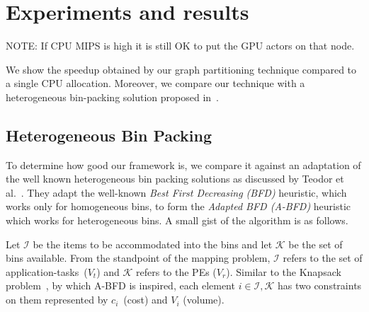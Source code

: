 \documentclass[10pt, conference, compsocconf]{IEEEtran}
\begin{document}




\section{Experiments and results}
\label{sec:experiments-results}
NOTE: If CPU MIPS is high it is still OK to put the GPU actors on that
node.

We show the speedup obtained by our graph partitioning technique
compared to a single CPU allocation. Moreover, we compare our technique
with a heterogeneous bin-packing solution proposed in~\cite{mmar11}.


\subsection{Heterogeneous Bin Packing}

To determine how good our framework is, we compare it against an
adaptation of the well known heterogeneous bin packing solutions as
discussed by Teodor et al.~\cite{tcra11}. They adapt the well-known
\textit{Best First Decreasing (BFD)} heuristic, which works only for
homogeneous bins, to form the \textit{Adapted BFD (A-BFD)} heuristic
which works for heterogeneous bins. A small gist of the algorithm is as
follows.

Let $\mathcal{I}$ be the items to be accommodated into the bins and let
$\mathcal{K}$ be the set of bins available.  From the standpoint of the
mapping problem, $\mathcal{I}$ refers to the set of
\mbox{application-tasks ($V_t$)} and $\mathcal{K}$ refers to the PEs
($V_r$). Similar to the Knapsack problem~\cite{sski08}, by which A-BFD
is inspired, each element $i \in \mathcal{I}, \mathcal{K}$ has two
constraints on them represented by \mbox{$c_i$ (cost)} and $V_i$
(volume). %
\end{document}
